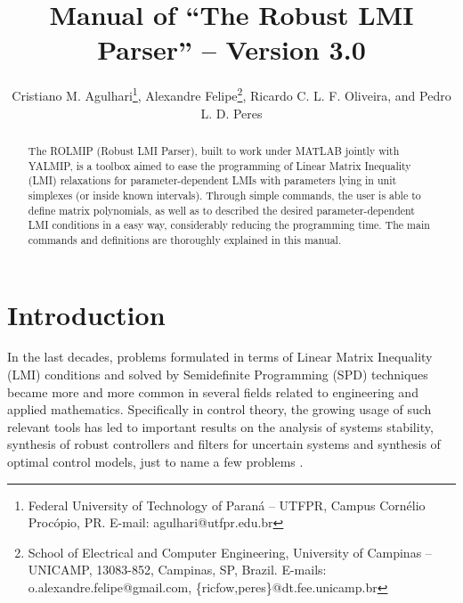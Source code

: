 \documentclass[english,11pt]{article}
\theoremstyle{break} \theorembodyfont{\small\rm}
\begin{document}

\title{Manual of ``The Robust LMI Parser'' -- Version 3.0}
        
\author{Cristiano M. Agulhari\thanks{Federal University of Technology of Paran\'{a} -- UTFPR, Campus Corn\'{e}lio Proc\'{o}pio, PR. E-mail: agulhari@utfpr.edu.br}, 
Alexandre Felipe\thanks{School of Electrical and Computer Engineering, University of Campinas -- UNICAMP,  13083-852, Campinas, SP, Brazil. E-mails: 
o.alexandre.felipe@gmail.com, \{ricfow,peres\}@dt.fee.unicamp.br}, Ricardo C. L. F. Oliveira\footnotemark[2], and Pedro L. D. Peres\footnotemark[2] }



\maketitle

\begin{abstract}                          %
The ROLMIP (Robust LMI Parser), built to work under MATLAB jointly with YALMIP, is a toolbox aimed to ease the 
programming of Linear Matrix Inequality (LMI) relaxations for parameter-dependent LMIs with parameters lying in unit simplexes (or inside known intervals).
Through simple commands, the user is able to define matrix polynomials, as well as to described the desired parameter-dependent LMI conditions in a easy way, considerably reducing
the programming time.
The main commands and definitions are thoroughly explained in this manual.

\end{abstract}



\section{Introduction}

In the last decades, problems formulated in terms of Linear Matrix Inequality (LMI)
conditions and solved by Semidefinite Programming (SPD) techniques became more and more
common in several fields related to engineering and applied mathematics. 
Specifically in control theory, the growing
usage of such relevant tools has led to important results on the analysis of systems stability, 
synthesis of robust controllers and filters
for uncertain systems and synthesis of optimal control models, just to name a few problems
\cite{BEFB:94}. 
\end{document}

